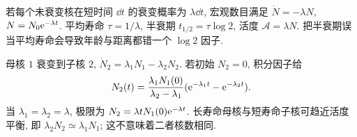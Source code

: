 若每个未衰变核在短时间 $\dd t$ 的衰变概率为 $\lambda\dd t$, 宏观数目满足 $\dot N=-\lambda N$, $N=N_0\mathrm e^{-\lambda t}$. 平均寿命 $\tau=1/\lambda$, 半衰期 $t_{1/2}=\tau\log2$, 活度 $\mathcal A=\lambda N$. 把半衰期误当平均寿命会导致年龄与距离都错一个 $\log2$ 因子.

母核 $1$ 衰变到子核 $2$, $\dot N_2=\lambda_1N_1-\lambda_2N_2$. 若初始 $N_2=0$, 积分因子给
\begin{equation}
 N_2(t)=\frac{\lambda_1N_1(0)}{\lambda_2-\lambda_1}
 (\mathrm e^{-\lambda_1t}-\mathrm e^{-\lambda_2t}).
\end{equation}
当 $\lambda_1=\lambda_2=\lambda$, 极限为 $N_2=\lambda tN_1(0)\mathrm e^{-\lambda t}$. 长寿命母核与短寿命子核可趋近活度平衡, 即 $\lambda_2N_2\simeq\lambda_1N_1$; 这不意味着二者核数相同.
